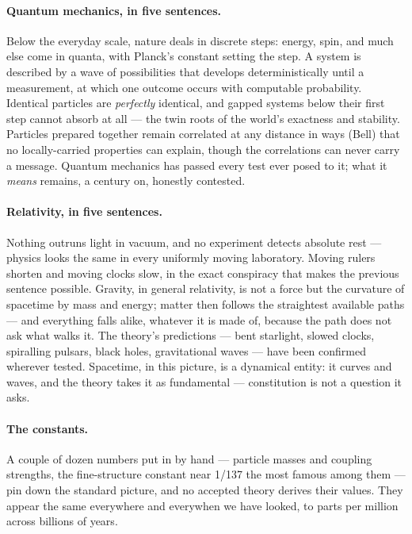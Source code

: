 \documentclass[fontsize=11pt,paper=a4,pagesize=auto,parskip=half-]{scrbook}
\begin{document}
\paragraph{Quantum mechanics, in five sentences.} Below the everyday scale, nature deals in discrete steps: energy, spin, and much else come in quanta, with Planck's constant setting the step. A system is described by a wave of possibilities that develops deterministically until a measurement, at which one outcome occurs with computable probability. Identical particles are \emph{perfectly} identical, and gapped systems below their first step cannot absorb at all --- the twin roots of the world's exactness and stability. Particles prepared together remain correlated at any distance in ways (Bell) that no locally-carried properties can explain, though the correlations can never carry a message. Quantum mechanics has passed every test ever posed to it; what it \emph{means} remains, a century on, honestly contested.

\paragraph{Relativity, in five sentences.} Nothing outruns light in vacuum, and no experiment detects absolute rest --- physics looks the same in every uniformly moving laboratory. Moving rulers shorten and moving clocks slow, in the exact conspiracy that makes the previous sentence possible. Gravity, in general relativity, is not a force but the curvature of spacetime by mass and energy; matter then follows the straightest available paths --- and everything falls alike, whatever it is made of, because the path does not ask what walks it. The theory's predictions --- bent starlight, slowed clocks, spiralling pulsars, black holes, gravitational waves --- have been confirmed wherever tested. Spacetime, in this picture, is a dynamical entity: it curves and waves, and the theory takes it as fundamental --- constitution is not a question it asks.

\paragraph{The constants.} A couple of dozen numbers put in by hand --- particle masses and coupling strengths, the fine-structure constant near 1/137 the most famous among them --- pin down the standard picture, and no accepted theory derives their values. They appear the same everywhere and everywhen we have looked, to parts per million across billions of years.
\end{document}
